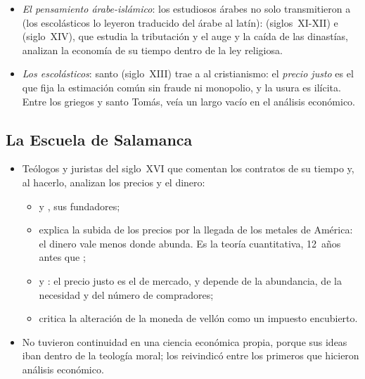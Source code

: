 \documentclass[11pt]{article}
\begin{document}
\begin{itemize}
\begin{itemize}
  \end{itemize}
\item \emph{El pensamiento árabe-islámico}: los estudiosos árabes no solo transmitieron a  (los escolásticos lo leyeron traducido del árabe al latín):  (siglos~XI-XII) e  (siglo~XIV), que estudia la tributación y el auge y la caída de las dinastías, analizan la economía de su tiempo dentro de la ley religiosa.
\item \emph{Los escolásticos}: santo  (siglo~XIII) trae a  al cristianismo: el \emph{precio justo} es el que fija la estimación común sin fraude ni monopolio, y la usura es ilícita\nocite{Daniel2021Histoire}. Entre los griegos y santo Tomás,  veía un largo vacío en el análisis económico.
\end{itemize}

\subsection{La Escuela de Salamanca}\label{anexo:salamanca}

\begin{itemize}
\item Teólogos y juristas del siglo~XVI que comentan los contratos de su tiempo y, al hacerlo, analizan los precios y el dinero\nocite{GriceHutchinson1952School}:
  \begin{itemize}
  \item {} y , sus fundadores;
  \item \textcite{Azpilcueta1556Cambios} explica la subida de los precios por la llegada de los metales de América: el dinero vale menos donde abunda. Es la teoría cuantitativa, 12~años antes que \textcite{Bodin1568Reponse} ;
  \item \textcite{Mercado1569Tratos} y \textcite{Molina1597Iustitia}: el precio justo es el de mercado, y depende de la abundancia, de la necesidad y del número de compradores;
  \item {} critica la alteración de la moneda de vellón como un impuesto encubierto\nocite{Mariana1609Monetae}.
  \end{itemize}
\item No tuvieron continuidad en una ciencia económica propia, porque sus ideas iban dentro de la teología moral;  los reivindicó entre los primeros que hicieron análisis económico\nocite{Schumpeter1954History}.
\end{itemize}
\end{document}
